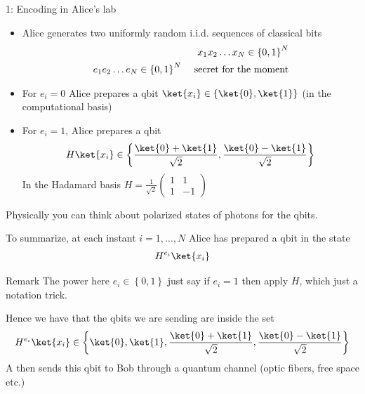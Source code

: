 \begin{parag}{1: Encoding in Alice's lab}
    \begin{itemize}
        \item Alice generates two uniformly random i.i.d. sequences of classical bits 
			\begin{align*} 
				x_1 x_2 \ldots x_N \in \left\{0, 1\right\}^{N}\\
				e_1 e_2 \ldots e_N \in \left\{0, 1\right\}^{N} \mathspace\text{ secret for the moment}
			\end{align*}
			\item For $e_i = 0$ Alice prepares a qbit $\ket{x_i} \in \left\{\ket{0}, \ket{1}\right\}$ (in the computational basis)
			\item For $e_i = 1$, Alice prepares a qbit 
				\begin{align*} 
					H\ket{x_i} \in \left\{\frac{\ket{0} + \ket{1}}{\sqrt{2}}, \frac{\ket{0} - \ket{1}}{\sqrt{2}}\right\} 
				\end{align*}
				In the Hadamard basis $H = \frac{1}{\sqrt{2}}\begin{pmatrix} 1 & 1 \\ 1 & -1 \end{pmatrix} $
    \end{itemize}
	\begin{framedremark}
	Physically you can think about polarized states of photons for the qbits.
	\end{framedremark}
	To summarize, at each instant $i= 1, \ldots, N$ Alice has prepared a qbit in the state 
	\begin{align*} 
		H^{e_i}\ket{x_i} 
	\end{align*}
	\begin{subparag}{Remark}
	    The power here $e_i \in \left\{0, 1\right\}$ just say if $e_i = 1$ then apply $H$, which just a notation trick.
	\end{subparag}
	Hence we have that the qbits we are sending are inside the set 
	\begin{align*} 
		H^{e_i}\ket{x_i} \in \left\{\ket{0}, \ket{1}, \frac{\ket{0} + \ket{1}}{\sqrt{2}}, \frac{\ket{0} - \ket{1}}{\sqrt{2}}\right\} 
	\end{align*}
	A then sends this qbit to Bob through a quantum channel (optic fibers, free space etc.)
\end{parag}

